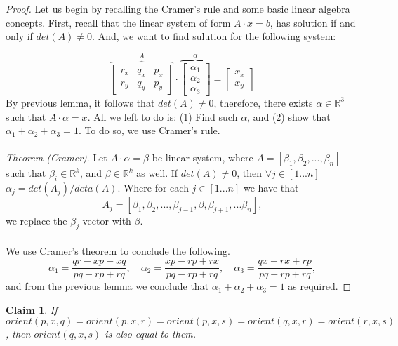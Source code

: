 \documentclass{article}
\newtheorem{claim}[theorem]{Claim}
\begin{document}
\begin{proof}
    Let us begin by recalling the Cramer's rule and some basic linear algebra concepts. 
    First, recall that the linear system of form $A\cdot x = b$, has solution if and only if 
    $det(A) \neq 0$. And, we want to find sulution for the following system: 

    \begin{equation*} 
        \overbrace{\left[\begin{matrix}
            r_x & q_x & p_x \\
            r_y & q_y & p_y
        \end{matrix}\right]}^{A} \cdot \overbrace{\left[
            \begin{matrix}
            \alpha_1 \\ \alpha_2 \\ \alpha_3
        \end{matrix}\right]}^{\alpha} = \left[ \begin{matrix} x_x \\ x_y \end{matrix} \right]
    \end{equation*} 
    By previous lemma, it follows that $det(A) \neq 0$, therefore, there exists 
    $\alpha \in \mathbb{R}^3$ such that $A\cdot \alpha = x$. All we left to do 
    is: (1) Find such $\alpha$, and (2) show that $\alpha_1 + \alpha_2 + \alpha_3 = 1$. 
    To do so, we use Cramer's rule. 
    \\
    \\
    \noindent \textit{Theorem (Cramer)}. Let $A \cdot \alpha = \beta$ be linear 
    system, where $A = [\beta_1, \beta_2, ..., \beta_n]$ such that $\beta_i \in 
    \mathbb{R}^k$, and $\beta \in \mathbb{R}^k$ as well. If $det(A) \neq 0$, then
    $\forall j \in [1...n]$ $\alpha_j = det(A_j)/deta(A)$. Where for each $j \in 
    [1...n]$ we have that $$A_j = [\beta_1, \beta_2, ..., \beta_{j-1}, \beta, 
    \beta_{j+1}, ... \beta_n],$$ we replace the $\beta_j$ vector with $\beta$. 
    \\
    \\
    \indent We use Cramer's theorem to conclude the following.
    $$ 
    \alpha_1 = \frac{qr - xp + xq}{pq - rp + rq}, \quad \alpha_2 = \frac{xp - rp + rx}{pq - rp + rq}, 
    \quad \alpha_3 = \frac{qx - rx + rp}{pq - rp + rq},
    $$ 
    and from the previous lemma we conclude that $\alpha_1 + \alpha_2 + \alpha_3 = 1$ as required. 

\end{proof}

\begin{claim}
If $orient(p, x, q) = orient(p, x, r) = orient(p, x, s) = orient(q, x, r) = 
orient(r, x, s)$, then $orient(q, x, s)$ is also equal to them.
\end{claim}
\end{document}
